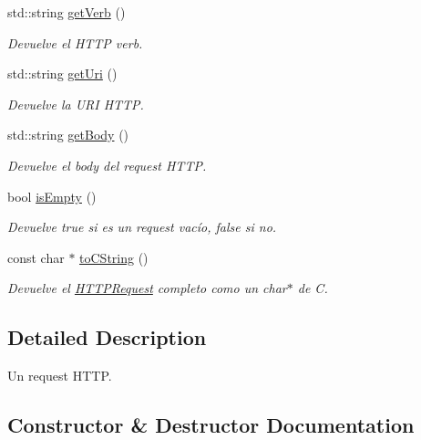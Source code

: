 \begin{DoxyCompactItemize}
std\+::string \hyperlink{class_h_t_t_p_request_a61c8ac8a58c99264eba833d60c2f6bed}{get\+Verb} ()
\begin{DoxyCompactList}\small\item\em Devuelve el H\+T\+T\+P verb. \end{DoxyCompactList}\item 
std\+::string \hyperlink{class_h_t_t_p_request_a8c16faf7c470e4b000782391b4978079}{get\+Uri} ()
\begin{DoxyCompactList}\small\item\em Devuelve la U\+R\+I H\+T\+T\+P. \end{DoxyCompactList}\item 
std\+::string \hyperlink{class_h_t_t_p_request_a205e7dbafc6888087b742f7de91d421d}{get\+Body} ()
\begin{DoxyCompactList}\small\item\em Devuelve el body del request H\+T\+T\+P. \end{DoxyCompactList}\item 
bool \hyperlink{class_h_t_t_p_request_ab9cbbd29971d2773d8d5dbeff9eb27d8}{is\+Empty} ()
\begin{DoxyCompactList}\small\item\em Devuelve true si es un request vacío, false si no. \end{DoxyCompactList}\item 
const char $\ast$ \hyperlink{class_h_t_t_p_request_acaf1b7dfb647339812e92d14d8921cfd}{to\+C\+String} ()
\begin{DoxyCompactList}\small\item\em Devuelve el \hyperlink{class_h_t_t_p_request}{H\+T\+T\+P\+Request} completo como un char$\ast$ de C. \end{DoxyCompactList}\end{DoxyCompactItemize}


\subsection{Detailed Description}
Un request H\+T\+T\+P. 

\subsection{Constructor \& Destructor Documentation}
\hypertarget{class_h_t_t_p_request_a7c53a92689eb5cee6b069a3db3c327ae}{}
